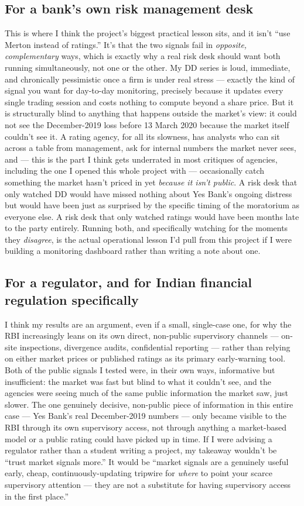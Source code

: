 \subsection{For a bank's own risk management desk}
This is where I think the project's biggest practical lesson sits, and it isn't ``use Merton instead of ratings.'' It's that the two signals fail in \emph{opposite, complementary} ways, which is exactly why a real risk desk should want both running simultaneously, not one or the other. My DD series is loud, immediate, and chronically pessimistic once a firm is under real stress — exactly the kind of signal you want for day-to-day monitoring, precisely because it updates every single trading session and costs nothing to compute beyond a share price. But it is structurally blind to anything that happens outside the market's view: it could not see the December-2019 loss before 13 March 2020 because the market itself couldn't see it. A rating agency, for all its slowness, has analysts who can sit across a table from management, ask for internal numbers the market never sees, and — this is the part I think gets underrated in most critiques of agencies, including the one I opened this whole project with — occasionally catch something the market hasn't priced in yet \emph{because it isn't public}. A risk desk that only watched DD would have missed nothing about Yes Bank's ongoing distress but would have been just as surprised by the specific timing of the moratorium as everyone else. A risk desk that only watched ratings would have been months late to the party entirely. Running both, and specifically watching for the moments they \emph{disagree}, is the actual operational lesson I'd pull from this project if I were building a monitoring dashboard rather than writing a note about one.

\subsection{For a regulator, and for Indian financial regulation specifically}
I think my results are an argument, even if a small, single-case one, for why the RBI increasingly leans on its own direct, non-public supervisory channels — on-site inspections, divergence audits, confidential reporting — rather than relying on either market prices or published ratings as its primary early-warning tool. Both of the public signals I tested were, in their own ways, informative but insufficient: the market was fast but blind to what it couldn't see, and the agencies were seeing much of the same public information the market saw, just slower. The one genuinely decisive, non-public piece of information in this entire case — Yes Bank's real December-2019 numbers — only became visible to the RBI through its own supervisory access, not through anything a market-based model or a public rating could have picked up in time. If I were advising a regulator rather than a student writing a project, my takeaway wouldn't be ``trust market signals more.'' It would be ``market signals are a genuinely useful early, cheap, continuously-updating tripwire for \emph{where} to point your scarce supervisory attention — they are not a substitute for having supervisory access in the first place.''

